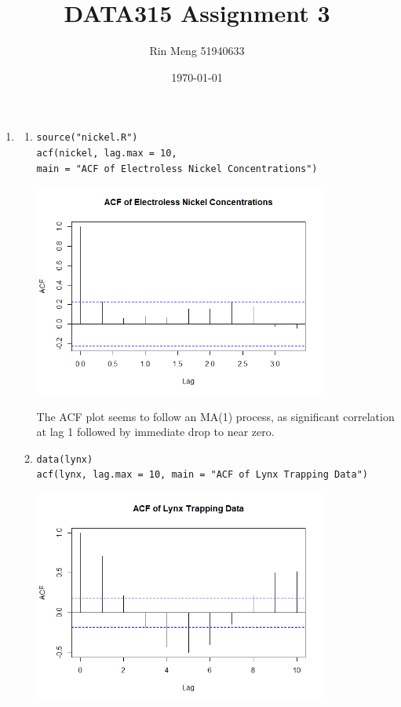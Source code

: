 \documentclass[12pt]{article}
\title{DATA315 Assignment 3}
\author{Rin Meng 51940633}
\date{\today}
\begin{document}
\maketitle

\begin{enumerate}
    \item
    \begin{enumerate}
    \item
    \begin{verbatim}
source("nickel.R")
acf(nickel, lag.max = 10, 
main = "ACF of Electroless Nickel Concentrations")
     \end{verbatim}
    \begin{center}
        \includegraphics[width=0.8\textwidth]{Rplot.png}
    \end{center}
    The ACF plot seems to follow an MA(1) process,
    as significant correlation at lag 1 followed by immediate drop to near zero. 
    \item
\begin{verbatim}
data(lynx)
acf(lynx, lag.max = 10, main = "ACF of Lynx Trapping Data")
\end{verbatim}
    \begin{center}
        \includegraphics[width=0.8\textwidth]{Rplot01.png}

\end{center}
\end{enumerate}
\end{enumerate}
\end{document}
